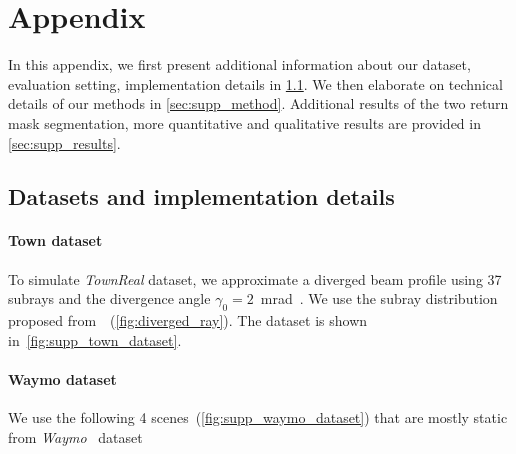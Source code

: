 \section{Appendix}
In this appendix, we first present additional information about our dataset, evaluation setting, implementation details in \cref{sec:supp_data}. We then elaborate on technical details of our methods in \cref{sec:supp_method}. Additional results of the two return mask segmentation, more quantitative and qualitative results are provided in \cref{sec:supp_results}.

\subsection{Datasets and implementation details}
\label{sec:supp_data}
\paragraph{Town dataset}
To simulate \textit{TownReal} dataset, we approximate a diverged beam profile using 37 subrays and the divergence angle $\gamma_0 = 2 $~mrad~\cite{glennie2012calibration}. We use the subray distribution proposed from~\cite{winiwarter2022virtual}~(\cf \cref{fig:diverged_ray}). The dataset is shown in~\cref{fig:supp_town_dataset}. 

\paragraph{Waymo dataset}
We use the following 4 scenes~(\cf \cref{fig:supp_waymo_dataset}) that are mostly static from \textit{Waymo}~\cite{sun2020scalability} dataset 


\begin{table}[!h]
    \setlength{\tabcolsep}{6pt}
    \renewcommand{\arraystretch}{1.2}
	\centering
\end{table}

